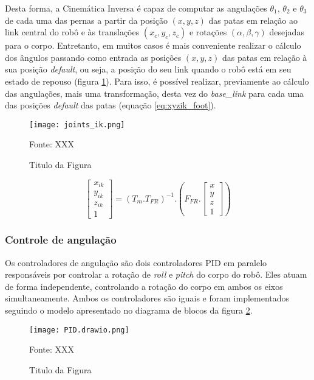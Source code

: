 \documentclass[../main.tex]{subfiles}
\begin{document}
Desta forma, a Cinemática Inversa é capaz de computar as angulações  $\theta_1$, $\theta_2$ e $\theta_3$ de cada uma das pernas a partir da posição $(x, y, z)$ das patas em relação ao link central do robô e às translações $(x_c, y_c, z_c)$ e rotações $(\alpha, \beta, \gamma)$ desejadas para o corpo. Entretanto, em muitos casos é mais conveniente realizar o cálculo dos ângulos passando como entrada as posições $(x, y, z)$ das patas em relação à sua posição \textit{default}, ou seja, a posição do seu link quando o robô está em seu estado de repouso (figura \ref{fig:joints_ik}). Para isso, é possível realizar, previamente ao cálculo das angulações, mais uma transformação, desta vez do \textit{base\_link} para cada uma das posições \textit{default} das patas (equação \ref{eq:xyzik_foot}).

\begin{figure}[h]
  \centering
  \caption{Titulo da Figura}
  \texttt{[image: joints\_ik.png]}

  Fonte: XXX
  \label{fig:joints_ik}
\end{figure}


\begin{equation}
  \label{eq:xyzik_foot}
  \begin{bmatrix}
    x_{ik} \\
    y_{ik} \\
    z_{ik} \\
    1
  \end{bmatrix}= (T_m.T_{FR})^{-1}.
  (F_{FR}.
  \begin{bmatrix}
    x \\
    y \\
    z \\
    1
  \end{bmatrix})
\end{equation}

\subsubsection{Controle de angulação}

Os controladores de angulação são dois controladores PID em paralelo responsáveis por controlar a rotação de \textit{roll} e \textit{pitch} do corpo do robô. Eles atuam de forma independente, controlando a rotação do corpo em ambos os eixos simultaneamente. Ambos os controladores são iguais e foram implementados seguindo o modelo apresentado no diagrama de blocos da figura \ref{fig:pid}.

\begin{figure}[h]
  \centering
  \caption{Titulo da Figura}
  \texttt{[image: PID.drawio.png]}

  Fonte: XXX
  \label{fig:pid}
\end{figure}
\end{document}
